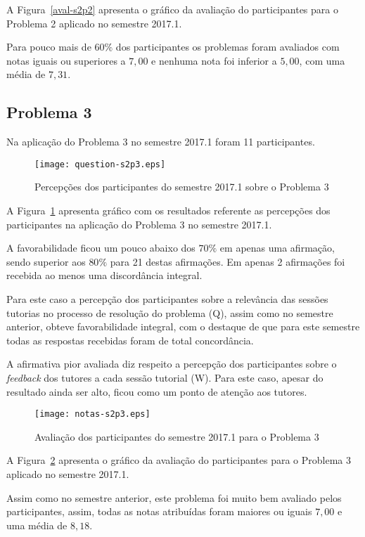 A Figura~\ref{aval-s2p2} apresenta o gráfico da
avaliação do participantes para o Problema 2 aplicado no semestre 2017.1.

Para pouco mais de $60\%$ dos participantes os problemas foram
avaliados com notas iguais ou superiores a $7,00$ e nenhuma nota
foi inferior a $5,00$, com uma média de $7,31$.

\subsection{Problema 3}
Na aplicação do Problema 3 no semestre 2017.1 foram 11 participantes.

\begin{figure}[!htb]
\centering
\texttt{[image: question-s2p3.eps]}
\caption{Percepções dos participantes do semestre 2017.1 sobre o Problema 3}
\label{percep-s2p3}
\end{figure}

A Figura~\ref{percep-s2p3} apresenta gráfico com os resultados referente
as percepções dos participantes na aplicação do
Problema 3 no semestre 2017.1.

A favorabilidade ficou um pouco abaixo dos $70\%$ em apenas uma afirmação,
sendo superior aos $80\%$ para 21 destas afirmações.
Em apenas 2 afirmações foi recebida ao menos uma discordância integral.

Para este caso a percepção dos participantes
sobre a relevância das sessões tutorias no processo
de resolução do problema (Q), assim como no semestre
anterior, obteve favorabilidade integral, com o destaque de
que para este semestre todas as respostas recebidas foram de
total concordância.

A afirmativa pior avaliada diz respeito a percepção dos participantes
sobre o \textit{feedback} dos tutores a cada sessão tutorial (W).
Para este caso, apesar do resultado ainda ser alto, ficou como
um ponto de atenção aos tutores.

\begin{figure}[!htb]
\centering
\texttt{[image: notas-s2p3.eps]}
\caption{Avaliação dos participantes do semestre 2017.1 para o Problema 3}
\label{aval-s2p3}
\end{figure}

A Figura~\ref{aval-s2p3} apresenta o gráfico da
avaliação do participantes para o Problema 3 aplicado no semestre 2017.1.


Assim como no semestre anterior, este problema foi muito bem avaliado
pelos participantes, assim, todas as notas atribuídas foram maiores
ou iguais $7,00$ e uma média de $8,18$.

